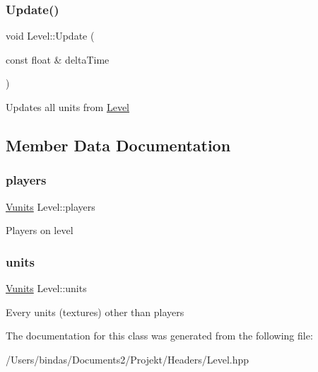 \subsubsection{\texorpdfstring{Update()}{Update()}}
{\footnotesize\ttfamily void Level\+::\+Update (\begin{DoxyParamCaption}\item[{const float \&}]{delta\+Time }\end{DoxyParamCaption})}

Updates all units from \mbox{\hyperlink{class_level}{Level}} 

\subsection{Member Data Documentation}
\mbox{\label{class_level_aaab0af4a98e967392e735e5f38231571}} 
\subsubsection{\texorpdfstring{players}{players}}
{\footnotesize\ttfamily \mbox{\hyperlink{class_level_a015a1fa25ecf592918309b2d06e5784b}{Vunits}} Level\+::players\hspace{0.3cm}{\ttfamily [private]}}

Players on level \mbox{\label{class_level_abdf229333597aada073f91fc9b4b6932}} 
\subsubsection{\texorpdfstring{units}{units}}
{\footnotesize\ttfamily \mbox{\hyperlink{class_level_a015a1fa25ecf592918309b2d06e5784b}{Vunits}} Level\+::units\hspace{0.3cm}{\ttfamily [private]}}

Every units (textures) other than players 

The documentation for this class was generated from the following file\+:\begin{DoxyCompactItemize}
\item 
/\+Users/bindas/\+Documents2/\+Projekt/\+Headers/Level.\+hpp\end{DoxyCompactItemize}
